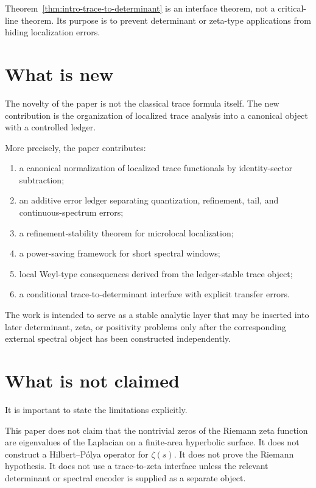 Theorem~\ref{thm:intro-trace-to-determinant} is an interface theorem, not a critical-line theorem.  Its purpose is to prevent determinant or zeta-type applications from hiding localization errors.

\section{What is new}
\label{sec:intro-novelty}

The novelty of the paper is not the classical trace formula itself.  The new contribution is the organization of localized trace analysis into a canonical object with a controlled ledger.

More precisely, the paper contributes:

\begin{enumerate}
  \item a canonical normalization of localized trace functionals by identity-sector subtraction;
  \item an additive error ledger separating quantization, refinement, tail, and continuous-spectrum errors;
  \item a refinement-stability theorem for microlocal localization;
  \item a power-saving framework for short spectral windows;
  \item local Weyl-type consequences derived from the ledger-stable trace object;
  \item a conditional trace-to-determinant interface with explicit transfer errors.
\end{enumerate}

The work is intended to serve as a stable analytic layer that may be inserted into later determinant, zeta, or positivity problems only after the corresponding external spectral object has been constructed independently.

\section{What is not claimed}
\label{sec:intro-not-claimed}

It is important to state the limitations explicitly.

This paper does not claim that the nontrivial zeros of the Riemann zeta function are eigenvalues of the Laplacian on a finite-area hyperbolic surface.  It does not construct a Hilbert--Pólya operator for \(\zeta(s)\).  It does not prove the Riemann hypothesis.  It does not use a trace-to-zeta interface unless the relevant determinant or spectral encoder is supplied as a separate object.


